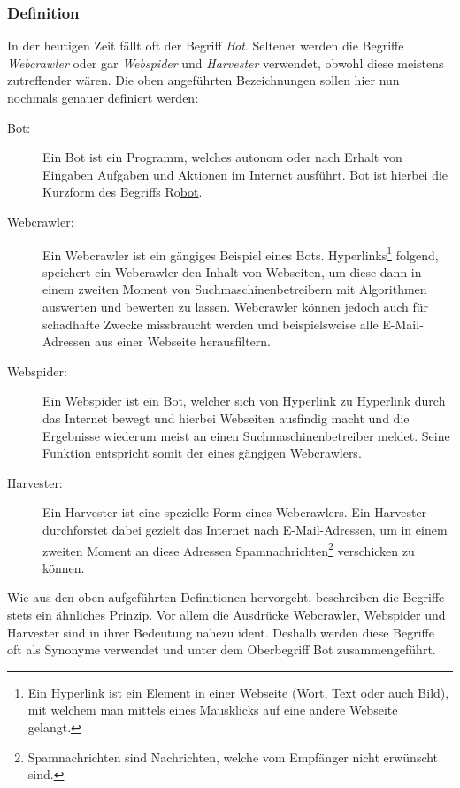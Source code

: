 \subsubsection{Definition}
In der heutigen Zeit fällt oft der Begriff \emph{Bot}. Seltener werden die Begriffe \emph{Webcrawler} oder gar \emph{Webspider} und \emph{Harvester} verwendet, obwohl diese meistens zutreffender wären. Die oben angeführten Bezeichnungen sollen hier nun nochmals genauer definiert werden: 
\begin{description}
	\item[Bot:] Ein Bot ist ein Programm, welches autonom oder nach Erhalt von Eingaben Aufgaben und Aktionen im Internet ausführt. Bot ist hierbei die Kurzform des Begriffs Ro\underline{bot}\cite{def-bot}.
	
	\item[Webcrawler:] Ein Webcrawler ist ein gängiges Beispiel eines Bots\cite{def-bot}. Hyperlinks\footnote{Ein Hyperlink ist ein Element in einer Webseite (Wort, Text oder auch Bild), mit welchem man mittels eines Mausklicks auf eine andere Webseite gelangt.} folgend, speichert ein Webcrawler den Inhalt von Webseiten, um diese dann in einem zweiten Moment von Suchmaschinenbetreibern mit Algorithmen auswerten und bewerten zu lassen\cite{def-bot}. Webcrawler können jedoch auch für schadhafte Zwecke missbraucht werden und beispielsweise alle E-Mail-Adressen aus einer Webseite herausfiltern. 
	
	\item[Webspider:] Ein Webspider ist ein Bot, welcher sich von Hyperlink zu Hyperlink durch das Internet bewegt und hierbei Webseiten ausfindig macht und die Ergebnisse wiederum meist an einen Suchmaschinenbetreiber meldet\cite{def-spider}. Seine Funktion entspricht somit der eines gängigen Webcrawlers.
	
	\item[Harvester:] Ein Harvester ist eine spezielle Form eines Webcrawlers. Ein Harvester durchforstet dabei gezielt das Internet nach E-Mail-Adressen, um in einem zweiten Moment an diese Adressen Spamnachrichten\footnote{Spamnachrichten sind Nachrichten, welche vom Empfänger nicht erwünscht sind.} verschicken zu können.
\end{description}
Wie aus den oben aufgeführten Definitionen hervorgeht, beschreiben die Begriffe stets ein ähnliches Prinzip. Vor allem die Ausdrücke Webcrawler, Webspider und Harvester sind in ihrer Bedeutung nahezu ident. Deshalb werden diese Begriffe oft als Synonyme verwendet und unter dem Oberbegriff Bot zusammengeführt.
\label{subsub:def}